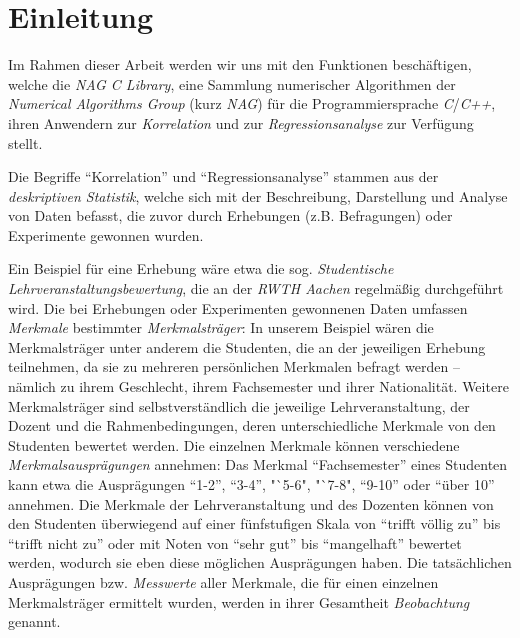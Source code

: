 \section{Einleitung}

Im Rahmen dieser Arbeit werden wir uns mit den Funktionen beschäftigen, welche die {\it NAG C Library}, eine Sammlung numerischer Algorithmen der {\it Numerical Algorithms Group} (kurz {\it NAG}) für die Programmiersprache {\it C}/{\it C++}, ihren Anwendern zur {\it Korrelation} und zur {\it Regressionsanalyse} zur Verfügung stellt.

Die Begriffe "`Korrelation"' und "`Regressionsanalyse"' stammen aus der {\it deskriptiven Statistik}, welche sich mit der Beschreibung, Darstellung und Analyse von Daten befasst, die zuvor durch Erhebungen (z.B. Befragungen) oder Experimente gewonnen wurden.

Ein Beispiel für eine Erhebung wäre etwa die sog. {\it Studentische Lehrveranstaltungsbewertung}, die an der {\it RWTH Aachen} regelmäßig durchgeführt wird. Die bei Erhebungen oder Experimenten gewonnenen Daten umfassen {\it Merkmale} bestimmter {\it Merkmalsträger}: In unserem Beispiel wären die Merkmalsträger unter anderem die Studenten, die an der jeweiligen Erhebung teilnehmen, da sie zu mehreren persönlichen Merkmalen befragt werden -- nämlich zu ihrem Geschlecht, ihrem Fachsemester und ihrer Nationalität. Weitere Merkmalsträger sind selbstverständlich die jeweilige Lehrveranstaltung, der Dozent und die Rahmenbedingungen, deren unterschiedliche Merkmale von den Studenten bewertet werden. Die einzelnen Merkmale können verschiedene {\it Merkmalsausprägungen} annehmen: Das Merkmal "`Fachsemester"' eines Studenten kann etwa die Ausprägungen "`1-2"', "`3-4"', "`5-6", "`7-8", "`9-10"' oder "`über 10"' annehmen. Die Merkmale der Lehrveranstaltung und des Dozenten können von den Studenten überwiegend auf einer fünfstufigen Skala von "`trifft völlig zu"' bis "`trifft nicht zu"' oder mit Noten von "`sehr gut"' bis "`mangelhaft"' bewertet werden, wodurch sie eben diese möglichen Ausprägungen haben. Die tatsächlichen Ausprägungen bzw. {\it Messwerte} aller Merkmale, die für einen einzelnen Merkmalsträger ermittelt wurden, werden in ihrer Gesamtheit {\it Beobachtung} genannt.

